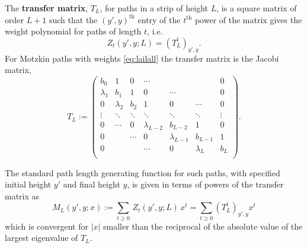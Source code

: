 \documentclass[11pt,a4paper]{article}
\newcommand{\la}{\lambda}
\newcommand{\defin}[1]{\textbf{#1}}		%
\newcommand{\df}{:=}
\begin{document}
The \defin{transfer matrix}, $T_L$, for paths in a strip of height $L$, is a square matrix of order $L+1$ such that the $(y', y)^{\text{th}}$ entry of the $t^{\text{th}}$ power of the matrix gives the weight polynomial for paths of length $t$, i.e. 
\begin{equation}
Z_t(y',y;L) = (T_L^t)_{y', y}.
\end{equation}
For Motzkin paths with weights \eqref{eq:lailall} the transfer matrix is the Jacobi matrix,
\begin{equation} \label{eq:transferMatrix}
T_L \df  
\left ( \begin{matrix}
b_0 & 1 & 0 &  \cdots &  & &  0\\
\la_1 & b_1 & 1 & 0 &  \cdots  & & 0\\
0 & \la_2 & b_2 & 1 & 0 & \cdots & 0\\
\vdots  & \ddots & \ddots & \ddots & \ddots & \ddots & \vdots\\
0 & \cdots & 0 & \la_{L-2} & b_{L-2} & 1 & 0\\
0 & & \cdots &  0 & \la_{L-1} & b_{L-1} & 1\\
0 & & & \cdots &  0 & \la_{L} & b_{L} \\
\end{matrix} \right ) .
\end{equation}


The standard  path length generating function  for such paths, with specified initial height $y'$ and final height  $y$, is given  in terms of powers of the transfer matrix as
\begin{equation} \label{eq:GxT}
			M_L(y', y;x) \df  \sum_{t \ge 0}\,  Z_t(y',y;L)\, x^t = \sum_{t \ge 0} (T_L^t)_{y',y}x^t  
\end{equation}
which is convergent for $|x|$ smaller than the reciprocal of the absolute value  of the largest eigenvalue of $T_L$.
\end{document}
